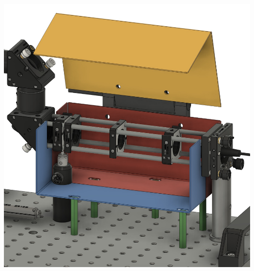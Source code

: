 \begin{minipage}[c]{0.48\textwidth}
    \begin{center}
        \includegraphics[width=\textwidth]{assets/figures/Protections_laser/Securite_mecanique/Protection_entree_laser/model_3D_ouvert.jpeg}
    \end{center}
    \label{model_3D_ouvert}
\end{minipage}



